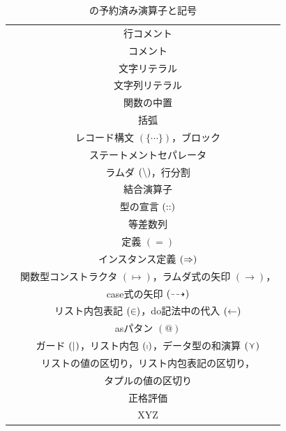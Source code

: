 \documentclass[a5paper,twoside,fleqn,draft]{jsbook}
\begin{document}
\begin{table}
\caption{\haskell の予約済み演算子と記号}
\label{tab:reserved-symbols}
\begin{center}
\begin{tabular}{||c|c||}
\hline
\code{--}&行コメント\\
\code{\{-} \code{-\}}&コメント\\
\hline
\code{'}&文字リテラル\\
\code{"}&文字列リテラル\\%
\code{`}&関数の中置\\
\code{(} \code{)}&括弧\\
\code{\{} \code{\}}&レコード構文 $(\{\dotsb\})$，ブロック\\
\code{;}&ステートメントセパレータ\\
\hline
\code{\textbackslash}&ラムダ $(\operatorname{\backslash})$，行分割\\
\code{:}&結合演算子\\
\code{::}&型の宣言 $(\operatorname{:\!:})$\\
\code{..}&等差数列\\
\code{=}&定義 $(=)$\\
\code{=>}&インスタンス定義 $(\operatorname{\Rightarrow})$\\
\code{->}&関数型コンストラクタ $(\mapsto)$，ラムダ式の矢印 $(\rightarrow)$，\\
&case式の矢印 $(\operatorname{\dashrightarrow})$\\
\code{<-}&リスト内包表記 $(\operatorname{\in})$，do記法中の代入 $(\operatorname{\leftarrow})$\\
\code{@}&asパタン $(@)$\\
\code{|}&ガード $(\mathop{\mid_{}})$，リスト内包 $(\operatorname{\shortmid})$，データ型の和演算 $(\operatorname{\curlyvee})$\\
\code{,}&リストの値の区切り，リスト内包表記の区切り，\\
&タプルの値の区切り\\
\hline
\code{!}&正格評価\\
\code{\textasciitilde}&XYZ\\
\hline
\end{tabular}
\end{center}
\end{table}
\end{document}
